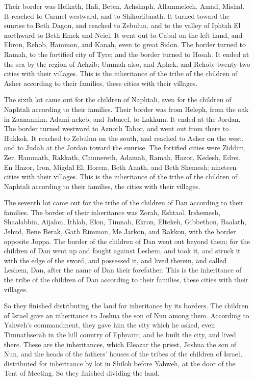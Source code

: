 {Their border was Helkath, Hali, Beten, Achshaph,
Allammelech, Amad, Mishal. It reached to Carmel westward, and to Shihorlibnath.
It turned toward the sunrise to Beth Dagon, and reached to Zebulun, and to the valley of Iphtah El northward to Beth Emek and Neiel. It went out to Cabul on the left hand,
and Ebron, Rehob, Hammon, and Kanah, even to great Sidon.
The border turned to Ramah, to the fortified city of Tyre; and the border turned to Hosah. It ended at the sea by the region of Achzib;
Ummah also, and Aphek, and Rehob: twenty-two cities with their villages.
This is the inheritance of the tribe of the children of Asher according to their families, these cities with their villages.
\par }{\PP {}The sixth lot came out for the children of Naphtali, even for the children of Naphtali according to their families.
Their border was from Heleph, from the oak in Zaanannim, Adami-nekeb, and Jabneel, to Lakkum. It ended at the Jordan.
The border turned westward to Aznoth Tabor, and went out from there to Hukkok. It reached to Zebulun on the south, and reached to Asher on the west, and to Judah at the Jordan toward the sunrise.
The fortified cities were Ziddim, Zer, Hammath, Rakkath, Chinnereth,
Adamah, Ramah, Hazor,
Kedesh, Edrei, En Hazor,
Iron, Migdal El, Horem, Beth Anath, and Beth Shemesh; nineteen cities with their villages.
This is the inheritance of the tribe of the children of Naphtali according to their families, the cities with their villages.
\par }{\PP {}The seventh lot came out for the tribe of the children of Dan according to their families.
The border of their inheritance was Zorah, Eshtaol, Irshemesh,
Shaalabbin, Aijalon, Ithlah,
Elon, Timnah, Ekron,
Eltekeh, Gibbethon, Baalath,
Jehud, Bene Berak, Gath Rimmon,
Me Jarkon, and Rakkon, with the border opposite Joppa.
The border of the children of Dan went out beyond them; for the children of Dan went up and fought against Leshem, and took it, and struck it with the edge of the sword, and possessed it, and lived therein, and called Leshem, Dan, after the name of Dan their forefather.
This is the inheritance of the tribe of the children of Dan according to their families, these cities with their villages.
\par }{\PP {}So they finished distributing the land for inheritance by its borders. The children of Israel gave an inheritance to Joshua the son of Nun among them.
According to Yahweh’s commandment, they gave him the city which he asked, even Timnathserah in the hill country of Ephraim; and he built the city, and lived there.
These are the inheritances, which Eleazar the priest, Joshua the son of Nun, and the heads of the fathers’ houses of the tribes of the children of Israel, distributed for inheritance by lot in Shiloh before Yahweh, at the door of the Tent of Meeting. So they finished dividing the land.

}
